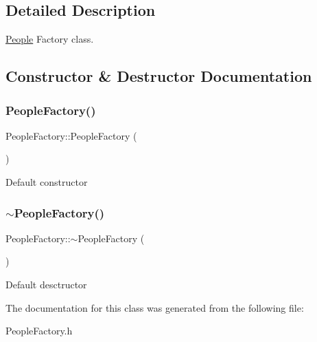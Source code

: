 \subsection{Detailed Description}
\hyperlink{classPeople}{People} Factory class. 

\subsection{Constructor \& Destructor Documentation}
\mbox{\label{classPeopleFactory_a937ce020364a355d6689c365ba70f0d6}} 
\subsubsection{\texorpdfstring{People\+Factory()}{PeopleFactory()}}
{\footnotesize\ttfamily People\+Factory\+::\+People\+Factory (\begin{DoxyParamCaption}{ }\end{DoxyParamCaption})}

Default constructor \mbox{\label{classPeopleFactory_a18d1aec526ba93ca84cde1c25cfb8944}} 
\subsubsection{\texorpdfstring{$\sim$\+People\+Factory()}{~PeopleFactory()}}
{\footnotesize\ttfamily People\+Factory\+::$\sim$\+People\+Factory (\begin{DoxyParamCaption}{ }\end{DoxyParamCaption})}

Default desctructor 

The documentation for this class was generated from the following file\+:\begin{DoxyCompactItemize}
\item 
People\+Factory.\+h\end{DoxyCompactItemize}
